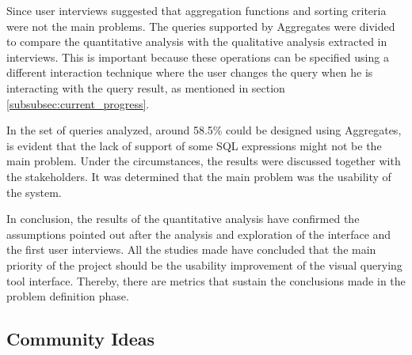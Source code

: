 Since user interviews suggested that aggregation functions and sorting criteria were not the main problems. The queries supported by Aggregates were divided to compare the quantitative analysis with the qualitative analysis extracted in interviews. This is important because these operations can be specified using a different interaction technique where the user changes the query when he is interacting with the query result, as mentioned in section \ref{subsubsec:current_progress}. 

\begin{table}[tb]
	\caption{Queries that could be designed using Aggregates and the queries which the tool does not support}
	\label{tab:aggregates_supported_vs_not_supported_stats}
\centering
{}
\end{table}

In the set of queries analyzed, around 58.5\% could be designed using Aggregates, is evident that the lack of support of some \gls{SQL} expressions might not be the main problem. Under the circumstances, the results were discussed together with the stakeholders. It was determined that the main problem was the usability of the system. 

In conclusion, the results of the quantitative analysis have confirmed the assumptions pointed out after the analysis and exploration of the interface and the first user interviews. All the studies made have concluded that the main priority of the project should be the usability improvement of the visual querying tool interface. Thereby, there are metrics that sustain the conclusions made in the problem definition phase.

\subsection{Community Ideas}
\label{subsec:community_ideas}

